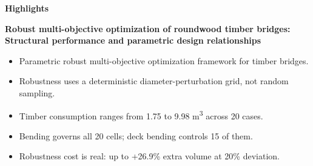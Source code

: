 \clearpage
\thispagestyle{empty}

\begin{center}
{\Large\bfseries Highlights}
\end{center}

\bigskip
\noindent\textbf{Robust multi-objective optimization of roundwood timber bridges: Structural performance and parametric design relationships}

\bigskip
\begin{itemize}
    \item Parametric robust multi-objective optimization framework for timber bridges.
    \item Robustness uses a deterministic diameter-perturbation grid, not random sampling.
    \item Timber consumption ranges from 1.75 to 9.98 m\textsuperscript{3} across 20 cases.
    \item Bending governs all 20 cells; deck bending controls 15 of them.
    \item Robustness cost is real: up to +26.9\% extra volume at 20\% deviation.
\end{itemize}
